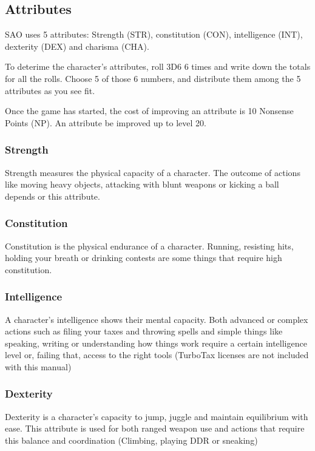 \subsection{Attributes}

SAO uses 5 attributes: Strength (STR), constitution (CON), intelligence (INT), dexterity (DEX) and charisma (CHA).
\par
To deterime the character's attributes, roll 3D6 6 times and write down the totals for all the rolls. Choose 5 of those 6 numbers, and distribute them among the 5 attributes as you see fit.
\par 
Once the game has started, the cost of improving an attribute is 10 Nonsense Points (NP). An attribute be improved up to level 20.

\subsubsection*{Strength}
Strength measures the physical capacity of a character. The outcome of actions like moving heavy objects, attacking with blunt weapons or kicking a ball depends or this attribute.

\subsubsection*{Constitution}
Constitution is the physical endurance of a character. Running, resisting hits, holding your breath or drinking contests are some things that require high constitution.

\subsubsection*{Intelligence}
A character's intelligence shows their mental capacity. Both advanced or complex actions such as filing your taxes and throwing spells and simple things like speaking, writing or understanding how things work require a certain intelligence level or, failing that, access to the right tools (TurboTax licenses are not included with this manual)

\subsubsection*{Dexterity}
Dexterity is a character's capacity to jump, juggle and maintain equilibrium with ease. This attribute is used for both ranged weapon use and actions that require this balance and coordination (Climbing, playing DDR or sneaking)

